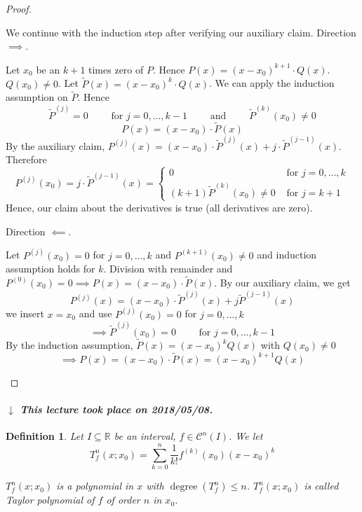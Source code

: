 \documentclass{article}
\newtheorem{definition}{Definition}  \numberwithin{definition}{section}
\newcommand{\dateref}[1]{%
  \begin{mdframed}[backgroundcolor=gray!10,innerbottommargin=0pt,innertopmargin=0pt]
    \paragraph{\textit{$\downarrow$ This lecture took place on #1.}}%
  \end{mdframed}%
}
\begin{document}
\begin{proof}
\begin{description}
      We continue with the induction step after verifying our auxiliary claim. Direction $\implies$.

      Let $x_0$ be an $k+1$ times zero of $P$. Hence $P(x) = (x - x_0)^{k+1} \cdot Q(x)$. $Q(x_0) \neq 0$.
      Let $\tilde P(x) = (x - x_0)^k \cdot Q(x)$. 
      We can apply the induction assumption on $\tilde P$. Hence
      \[ \tilde P^{(j)} = 0 \qquad \text{ for } j = 0, \ldots, k-1 \qquad \text{ and } \qquad \tilde P^{(k)}(x_0) \neq 0 \]
      \[ P(x) = (x - x_0) \cdot \tilde P(x) \]
      By the auxiliary claim, $P^{(j)}(x) = (x - x_0) \cdot \tilde P^{(j)}(x) + j \cdot \tilde P^{(j-1)}(x)$.
      Therefore
      \[
        P^{(j)}(x_0) = j \cdot \tilde P^{(j-1)}(x) = \begin{cases}
          0 & \text{ for } j = 0, \dots, k \\
          (k+1)\tilde P^{(k)}(x_0) \neq 0 & \text{ for } j = k+1
        \end{cases}
      \]
      Hence, our claim about the derivatives is true (all derivatives are zero).

      Direction $\impliedby$.

      Let $P^{(j)}(x_0) = 0$ for $j = 0, \dots, k$ and $P^{(k+1)}(x_0) \neq 0$ and induction assumption holds for $k$.
      Division with remainder and $P^{(0)}(x_0) = 0 \implies P(x) = (x - x_0) \cdot \tilde P(x)$.
      By our auxiliary claim, we get
      \[ P^{(j)}(x) = (x - x_0) \cdot \tilde P^{(j)}(x) + j \tilde P^{(j-1)}(x) \]
      we insert $x = x_0$ and use $P^{(j)}(x_0) = 0$ for $j = 0, \dots, k$
      \[ \implies \tilde P^{(j)}(x_0) = 0 \qquad \text{ for } j = 0, \dots, k-1 \]
      By the induction assumption, $\tilde P(x) = (x - x_0)^k Q(x)$ with $Q(x_0) \neq 0$
      \[ \implies P(x) = (x - x_0) \cdot \tilde P(x) = (x - x_0)^{k+1} Q(x) \]
  \end{description}
\end{proof}

\dateref{2018/05/08}

\begin{definition} %
  \label{def3}
  Let $I \subseteq \mathbb R$ be an interval, $f \in \mathcal C^n(I)$.
  We let
  \[ T_f^n(x; x_0) = \sum_{k=0}^n \frac{1}{k!} f^{(k)}(x_0) (x - x_0)^k \]

  $T_f^n(x; x_0)$ is a polynomial in $x$ with $\operatorname{degree}(T_f^n) \leq n$.
  $T_f^n(x; x_0)$ is called \emph{Taylor polynomial of $f$ of order $n$ in $x_0$}.
\end{definition}
\end{document}

